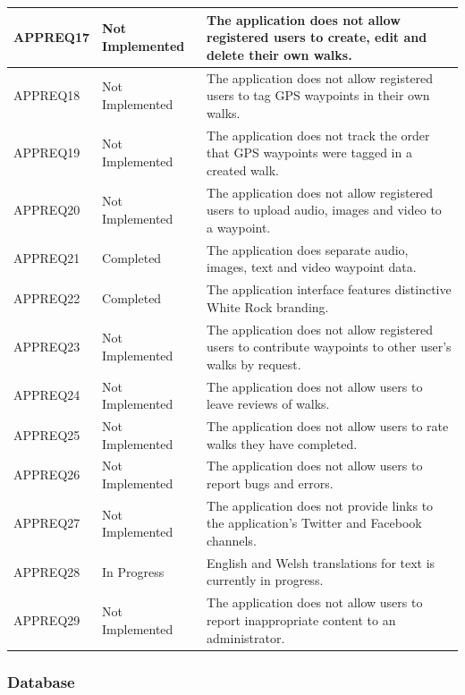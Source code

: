 \documentclass[11pt,a4paper]{article}
\begin{document}
\begin{longtable}{ p{}|p{}|p{} }
APPREQ17 & Not Implemented & The application does not allow registered users to create, edit and delete their own walks. \\ \hline
APPREQ18 & Not Implemented & The application does not allow registered users to tag GPS waypoints in their own walks. \\ \hline
APPREQ19 & Not Implemented & The application does not track the order that GPS waypoints were tagged in a created walk. \\ \hline
APPREQ20 & Not Implemented & The application does not allow registered users to upload audio, images and video to a waypoint. \\ \hline
APPREQ21 & Completed & The application does separate audio, images, text and video waypoint data. \\ \hline
APPREQ22 & Completed & The application interface features distinctive White Rock branding. \\ \hline
APPREQ23 & Not Implemented & The application does not allow registered users to contribute waypoints to other user's walks by request. \\ \hline
APPREQ24 & Not Implemented & The application does not allow users to leave reviews of walks. \\ \hline
APPREQ25 & Not Implemented & The application does not allow users to rate walks they have completed. \\ \hline
APPREQ26 & Not Implemented & The application does not allow users to report bugs and errors. \\ \hline
APPREQ27 & Not Implemented & The application does not provide links to the application's Twitter and Facebook channels. \\ \hline
APPREQ28 & In Progress & English and Welsh translations for text is currently in progress. \\ \hline
APPREQ29 & Not Implemented & The application does not allow users to report inappropriate content to an administrator. \\ \hline
\end{longtable}

\subsubsection{Database}
\label{sec:db-reqs}
\end{document}

